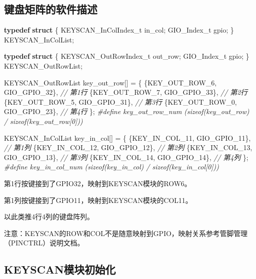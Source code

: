 \documentclass[
  12pt,
]{book}
\newenvironment{Shaded}{\begin{snugshade}}{\end{snugshade}}
\newcommand{\CommentTok}[1]{\textcolor[rgb]{0.56,0.35,0.01}{\textit{#1}}}
\newcommand{\KeywordTok}[1]{\textcolor[rgb]{0.13,0.29,0.53}{\textbf{#1}}}
\newcommand{\NormalTok}[1]{#1}
\newcommand{\PreprocessorTok}[1]{\textcolor[rgb]{0.56,0.35,0.01}{\textit{#1}}}
\begin{document}
\hypertarget{ux952eux76d8ux77e9ux9635ux7684ux8f6fux4ef6ux63cfux8ff0}{%
\subsection{键盘矩阵的软件描述}\label{ux952eux76d8ux77e9ux9635ux7684ux8f6fux4ef6ux63cfux8ff0}}

\begin{Shaded}
\begin{Highlighting}[]
\KeywordTok{typedef} \KeywordTok{struct}\NormalTok{ \{}
\NormalTok{    KEYSCAN_InColIndex_t in_col;}
\NormalTok{    GIO_Index_t gpio;}
\NormalTok{\} KEYSCAN_InColList;}

\KeywordTok{typedef} \KeywordTok{struct}\NormalTok{ \{}
\NormalTok{    KEYSCAN_OutRowIndex_t out_row;}
\NormalTok{    GIO_Index_t gpio;}
\NormalTok{\} KEYSCAN_OutRowList;}
\end{Highlighting}
\end{Shaded}

\begin{Shaded}
\begin{Highlighting}[]
\NormalTok{KEYSCAN_OutRowList key_out_row[] = \{}
\NormalTok{    \{KEY_OUT_ROW_6, GIO_GPIO_32\}, }\CommentTok{// 第1行}
\NormalTok{    \{KEY_OUT_ROW_7, GIO_GPIO_33\}, }\CommentTok{// 第2行}
\NormalTok{    \{KEY_OUT_ROW_5, GIO_GPIO_31\}, }\CommentTok{// 第3行}
\NormalTok{    \{KEY_OUT_ROW_0, GIO_GPIO_23\}, }\CommentTok{// 第4行}
\NormalTok{\};}
\PreprocessorTok{#define key_out_row_num (sizeof(key_out_row) / sizeof(key_out_row[0]))}

\NormalTok{KEYSCAN_InColList key_in_col[] = \{}
\NormalTok{    \{KEY_IN_COL_11, GIO_GPIO_11\}, }\CommentTok{// 第1列}
\NormalTok{    \{KEY_IN_COL_12, GIO_GPIO_12\}, }\CommentTok{// 第2列}
\NormalTok{    \{KEY_IN_COL_13, GIO_GPIO_13\}, }\CommentTok{// 第3列}
\NormalTok{    \{KEY_IN_COL_14, GIO_GPIO_14\}, }\CommentTok{// 第4列}
\NormalTok{\};}
\PreprocessorTok{#define key_in_col_num (sizeof(key_in_col) / sizeof(key_in_col[0]))}
\end{Highlighting}
\end{Shaded}

第1行按键接到了GPIO32，映射到KEYSCAN模块的ROW6。

第1列按键接到了GPIO11，映射到KEYSCAN模块的COL11。

以此类推4行4列的键盘阵列。

注意：KEYSCAN的ROW和COL不是随意映射到GPIO，映射关系参考管脚管理（PINCTRL）说明文档。

\hypertarget{keyscanux6a21ux5757ux521dux59cbux5316}{%
\subsection{KEYSCAN模块初始化}\label{keyscanux6a21ux5757ux521dux59cbux5316}}
\end{document}
